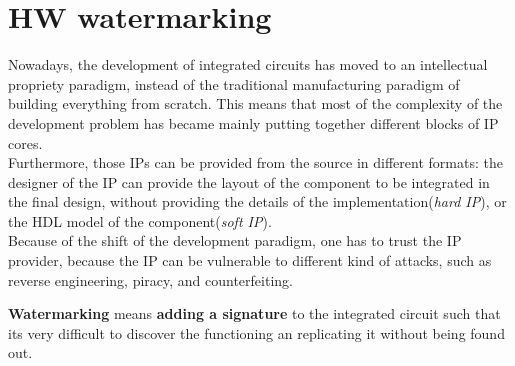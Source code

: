 \chapter{HW watermarking}
Nowadays, the development of integrated circuits has moved to an intellectual propriety paradigm, 
instead of the traditional manufacturing paradigm of building everything from scratch.
This means that most of the complexity of the development problem has became mainly putting together
different blocks of IP cores.\\
Furthermore, those IPs can be provided from the source in different formats: the designer of the IP can provide
the layout of the component to be integrated in the final design, without providing the details of the
implementation(\textit{hard IP}), or the HDL model of the component(\textit{soft IP}).\\
Because of the shift of the development paradigm, one has to trust the IP provider, because the IP can be
vulnerable to different kind of attacks, such as reverse engineering, piracy, and counterfeiting.
\begin{boxH}
  \textbf{Watermarking} means \textbf{adding a signature} to the integrated circuit such that its 
  very difficult to discover the functioning an replicating it without being found out.
\end{boxH}

